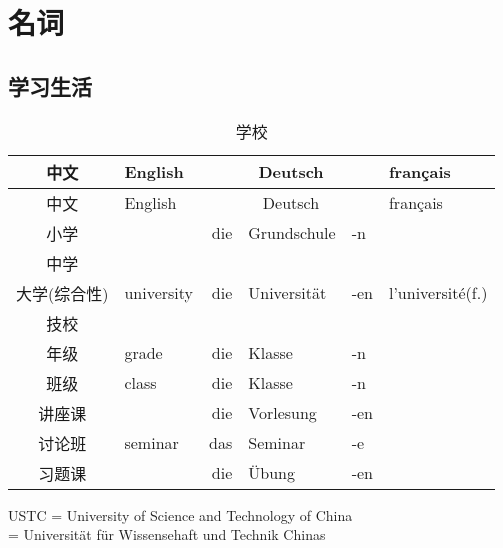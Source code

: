 \documentclass[12pt,A4paper,oneside,reqno]{amsart}
\numberwithin{equation}{section}
\theoremstyle{plain}
\theoremstyle{plain}
\theoremstyle{plain}
\numberwithin{equation}{section}
\theoremstyle{remark}
\begin{document}
\section{名词}
\subsection{学习生活}\hspace{1cm}
\begin{longtable}{c|l|rll|l}
	
	\hline
	中文	&	English	&\multicolumn{3}{c|}{Deutsch} &	français  	\\
	
	
	
	\hline
	\endhead
	\hline
	中文	&	English	&\multicolumn{3}{c|}{Deutsch} &	français  	\\
	
	
	
	\hline
	\endfirsthead	
	\hline
	\endfoot
	\hline		
	\caption{学校}
	\endlastfoot				
	
小学	&		&	die	&	Grundschule	&	-n	&		\\
中学	&		&		&		&		&		\\
大学(综合性)	&	university	&	die	&	Universit\"{a}t	&	-en	&	l'universit\'{e}(f.)	\\
技校	&		&		&		&		&		\\
年级	&	grade	&	die	&	Klasse	&	-n	&		\\
班级	&	class	&	die	&	Klasse	&	-n	&		\\
讲座课	&		&	die	&	Vorlesung	&	-en	&		\\
讨论班	&	seminar	&	das	&	Seminar	&	-e	&		\\
习题课	&		&	die	&	\"{U}bung	&	-en	&		\\

	
	
	
	
	
\end{longtable}

\noindent USTC = University of Science and Technology of China\\
\phantom{USTC} = Universit\"{a}t f\"{u}r Wissensehaft und Technik Chinas
\end{document}
